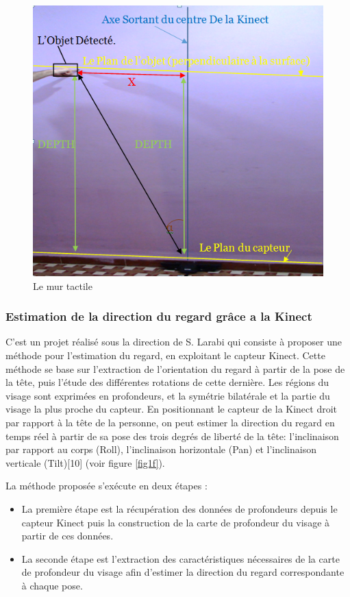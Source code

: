 \documentclass[12pt,a4paper,oneside]{book}
\begin{document}
	\begin{figure}[H]
		\centering
		\includegraphics[scale=0.62]{m1.png}
		\caption{Le mur tactile}
		\label{figm}
	\end{figure}
	
	
	
	\subsubsection{Estimation de la direction du regard grâce a la Kinect}
	
	C'est un projet réalisé sous la direction de S. Larabi \cite{10} qui consiste à proposer une méthode pour l’estimation du regard, en exploitant le capteur Kinect. Cette méthode se base sur l'extraction de l'orientation du regard à partir de la pose de la tête, puis l'étude des différentes rotations de cette dernière.
	Les régions du visage sont exprimées en profondeurs, et la symétrie bilatérale et la partie du visage la plus proche du capteur. En positionnant le capteur de la Kinect droit par rapport à la tête de la personne, on peut estimer la direction du regard en temps réel à partir de sa pose des trois degrés de liberté de la tête: l’inclinaison par rapport au corps (Roll), l’inclinaison horizontale (Pan) et l’inclinaison verticale (Tilt)[10] (voir figure \ref{fig1f}).
	
	La méthode proposée s'exécute en deux étapes :
	\begin{itemize}
		\item La première étape est la récupération des données de profondeurs depuis le capteur Kinect puis la construction de la carte de profondeur du visage à partir de ces données.
		\item La seconde étape est l’extraction des caractéristiques nécessaires de la carte de profondeur du visage afin d’estimer la direction du regard correspondante à chaque pose.
	\end{itemize}
	
\end{document}

